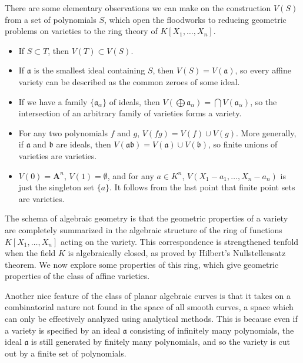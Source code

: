 There are some elementary observations we can make on the construction $V(S)$ from a set of polynomials $S$, which open the floodworks to reducing geometric problems on varieties to the ring theory of $K[X_1, \dots, X_n]$.
%
\begin{itemize}
    \item If $S \subset T$, then $V(T) \subset V(S)$.

    \item If $\mathfrak{a}$ is the smallest ideal containing $S$, then $V(S) = V(\mathfrak{a})$, so every affine variety can be described as the common zeroes of some ideal.

    \item If we have a family $\{ \mathfrak{a}_\alpha \}$ of ideals, then $V(\bigoplus \mathfrak{a}_\alpha) = \bigcap V(\mathfrak{a}_\alpha)$, so the intersection of an arbitrary family of varieties forms a variety.

    \item For any two polynomials $f$ and $g$, $V(fg) = V(f) \cup V(g)$. More generally, if $\mathfrak{a}$ and $\mathfrak{b}$ are ideals, then $V(\mathfrak{a}\mathfrak{b}) = V(\mathfrak{a}) \cup V(\mathfrak{b})$, so finite unions of varieties are varieties.

    \item $V(0) = \mathbf{A}^n$, $V(1) = \emptyset$, and for any $a \in K^n$, $V(X_1-a_1,\dots,X_n - a_n)$ is just the singleton set $\{ a \}$. It follows from the last point that finite point sets are varieties.
\end{itemize}
%
The schema of algebraic geometry is that the geometric properties of a variety are completely summarized in the algebraic structure of the ring of functions $K[X_1, \dots, X_n]$ acting on the variety. This correspondence is strengthened tenfold when the field $K$ is algebraically closed, as proved by Hilbert's Nullstellensatz theorem. We now explore some properties of this ring, which give geometric properties of the class of affine varieties.

Another nice feature of the class of planar algebraic curves is that it takes on a combinatorial nature not found in the space of all smooth curves, a space which can only be effectively analyzed using analytical methods. This is because even if a variety is specified by an ideal $\mathfrak{a}$ consisting of infinitely many polynomials, the ideal $\mathfrak{a}$ is still generated by finitely many polynomials, and so the variety is cut out by a finite set of polynomials.

